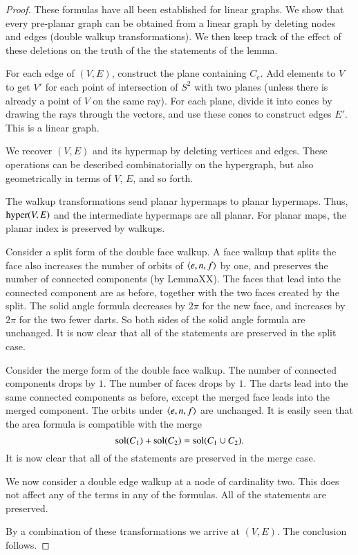 \begin{proof}  These formulas have all been established for linear
graphs.  We show that every pre-planar graph can be obtained from a
linear graph by deleting nodes and edges (double walkup
transformations).  We then keep track of the effect of these
deletions on the truth of the the statements of the lemma.

For each edge of $(V,E)$, construct the plane containing $C_e$. Add
elements to $V$ to get $V'$ for each point of intersection of $S^2$
with two planes (unless there is already a point of $V$ on the same
ray). For each plane, divide it into cones by drawing the rays
through the vectors, and use these cones to construct edges $E'$.
This is a linear graph.

We recover $(V,E)$ and its hypermap by deleting vertices and edges.
These operations can be described combinatorially on the hypergraph,
but also geometrically in terms of $V$, $E$, and so forth.

The walkup transformations send planar hypermaps to planar
hypermaps.  Thus, ${\operatorname{hyper}}(V,E)$ and the intermediate hypermaps
are all planar.  For planar maps, the planar index is preserved by
walkups.

Consider a split form of the double face walkup.  A face walkup that
splits the face also increases the number of orbits of
$\langle e,n,f\rangle$ by one, and preserves the number of connected
components (by LemmaXX).  The faces that lead into the connected
component are as before, together with the two faces created by the
split.  The solid angle formula decreases by $2\pi$ for the new
face, and increases by $2\pi$ for the two fewer darts.  So both
sides of the solid angle formula are unchanged.  It is now clear
that all of the statements are preserved in the split case.

Consider the merge form of the double face walkup.  The number of
connected components drops by $1$.  The number of faces drops by
$1$.  The darts lead into the same connected components as before,
except the merged face leads into the merged component.  The orbits
under $\langle e,n,f\rangle$ are unchanged.  It is easily seen that the
area formula is compatible with the merge $${\operatorname{sol}}(C_1) +
{\operatorname{sol}}(C_2) = {\operatorname{sol}}(C_1\cup C_2).$$ It is now clear that all of
the statements are preserved in the merge case.

We now consider a double edge walkup at a node of cardinality two.
This does not affect any of the terms in any of the formulas.  All
of the statements are preserved.

By a combination of these transformations we arrive at $(V,E)$.  The
conclusion follows.
\end{proof}


